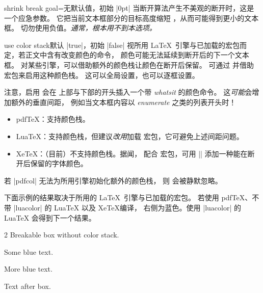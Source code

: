\begin{docTcbKey}{shrink break goal}{=}{无默认值，初始 |0pt|}
  当断开算法产生不美观的断开时，这是一个应急参数。
  它把当前文本框部分的目标高度缩短 ，从而可能得到更小的文本框。
  切勿使用负值。\emph{通常，根本用不到本选项。}
\end{docTcbKey}



\begin{docTcbKey}[][doc new=2020-10-09]{use color stack}{}{默认 |true|，初始 |false|}
  视所用 \LaTeX\ 引擎与已加载的宏包而定，若正文中含有改变颜色的命令，
  颜色可能无法延续到断开后的下一个文本框。
  对某些引擎，可以借助额外的颜色栈让颜色在断开后保留。
  可通过  并借助  宏包来启用这种颜色栈。
  这可以全局设置，也可以逐框设置。
  \begin{marker}
  注意，启用  会在
   上部与下部的开头插入一个带 \emph{whatsit} 的颜色命令。
  这\emph{可能}会增加额外的垂直间距，
  例如当文本框内容以 \emph{enumerate} 之类的列表开头时！
  \end{marker}
  \begin{itemize}
  \item pdf\TeX：支持颜色栈。
  \item Lua\TeX：支持颜色栈，但建议\emph{改用}加载
      宏包，它可避免上述间距问题。
  \item Xe\TeX：（目前）不支持颜色栈。据闻，
     配合  宏包，可用
     || 添加一种能在断开后保留的字体颜色。
  \end{itemize}
  若 |pdfcol| 无法为所用引擎初始化额外的颜色栈，
  则  会被静默忽略。

\clearpage
下面示例的结果取决于所用的 \LaTeX\ 引擎与已加载的宏包。
若使用 pdf\TeX、不带 |luacolor| 的 Lua\TeX{} 以及 Xe\TeX 编译，
右侧为蓝色。使用 |luacolor| 的 Lua\TeX{} 会得到下一个结果。

\begin{dispExample}
\begin{multicols}{2}\footnotesize
Breakable box without color stack.
\begin{tcolorbox}[enhanced jigsaw,
  size=small, colframe=gray, colback=yellow!10!white, colupper=blue,
  enforce breakable,%
  vfill before first, pad at break=1mm, break at=33mm ]
    Some blue text.\par\smallskip
    {\color{red}\itshape\lipsum[2]}\par\smallskip
    More blue text.
\end{tcolorbox}
Text after box.
\end{multicols}
\end{dispExample}


\end{docTcbKey}
